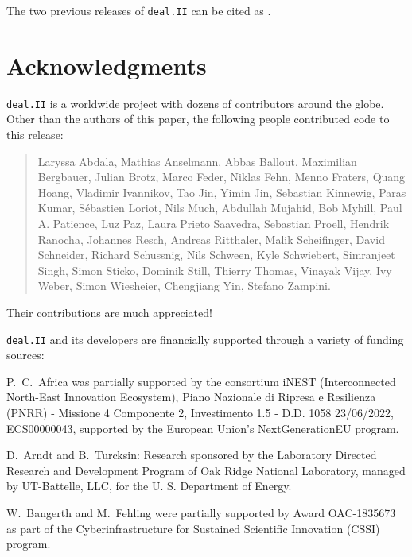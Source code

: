 \documentclass{ansarticle-preprint}
\newcommand{\specialword}[1]{\texttt{#1}}
\newcommand{\dealii}{{\specialword{deal.II}}\xspace}
\begin{document}
The two previous releases of \dealii can be cited as
\cite{dealII94,dealII95}.


\section{Acknowledgments}

\dealii is a worldwide project with dozens of contributors around the
globe. Other than the authors of this paper, the following people
contributed code to this release:\\

\begin{quote}
Laryssa      Abdala,
Mathias      Anselmann,
Abbas        Ballout,
Maximilian   Bergbauer,
Julian       Brotz,
Marco        Feder,
Niklas       Fehn,
Menno        Fraters,
Quang        Hoang,
Vladimir     Ivannikov,
Tao          Jin,
Yimin        Jin,
Sebastian    Kinnewig,
Paras        Kumar,
Sébastien    Loriot,
Nils         Much,
Abdullah     Mujahid,
Bob          Myhill,
Paul A.      Patience,
Luz          Paz,
Laura        Prieto Saavedra,
Sebastian    Proell,
Hendrik      Ranocha,
Johannes     Resch,
Andreas      Ritthaler,
Malik        Scheifinger,
David        Schneider,
Richard      Schussnig,
Nils         Schween,
Kyle         Schwiebert,
Simranjeet   Singh,
Simon        Sticko,
Dominik      Still,
Thierry      Thomas,
Vinayak      Vijay,
Ivy          Weber,
Simon        Wiesheier,
Chengjiang   Yin,
Stefano      Zampini.
\end{quote}
Their contributions are much appreciated!


\bigskip

\dealii and its developers are financially supported through a
variety of funding sources:

P.~C.~Africa was partially supported by the consortium iNEST (Interconnected North-East Innovation Ecosystem),
Piano Nazionale di Ripresa e Resilienza (PNRR) - Missione 4 Componente 2, Investimento 1.5 - D.D. 1058 23/06/2022,
ECS00000043, supported by the European Union's NextGenerationEU program.

D.~Arndt and B.~Turcksin: Research sponsored by the Laboratory Directed Research and
Development Program of Oak Ridge National Laboratory, managed by UT-Battelle,
LLC, for the U. S. Department of Energy.

W.~Bangerth and M.~Fehling were partially supported by Award OAC-1835673
as part of the Cyberinfrastructure for Sustained Scientific Innovation (CSSI)
program.
\end{document}
